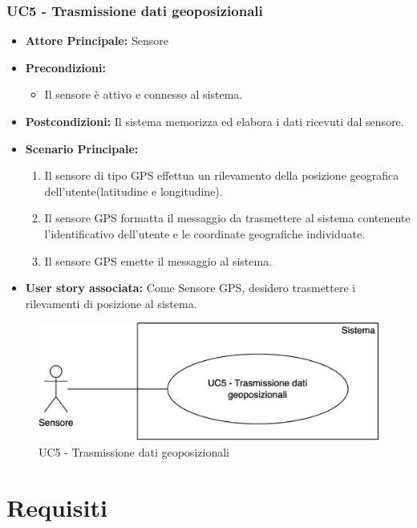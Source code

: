 \documentclass[11pt]{article}
\begin{document}
\begin{justify}
\subsubsection{\textbf{UC5 - Trasmissione dati geoposizionali}}
\begin{itemize}
    \item \textbf{Attore Principale:} Sensore
    \item \textbf{Precondizioni:} 
        \begin{itemize}
    	\item Il sensore è attivo e connesso al sistema.
        \end{itemize}
    \item \textbf{Postcondizioni:} Il sistema memorizza ed elabora i dati ricevuti dal sensore.
    \item \textbf{Scenario Principale:} 
        \begin{enumerate}
            \item Il sensore di tipo GPS effettua un rilevamento della posizione geografica dell'utente(latitudine e longitudine).
            \item Il sensore GPS formatta il messaggio da trasmettere al sistema contenente l’identificativo dell'utente e le coordinate geografiche individuate.
            \item Il sensore GPS emette il messaggio al sistema.
        \end{enumerate}
    \item \textbf{User story associata:} Come Sensore GPS, desidero trasmettere i rilevamenti di posizione al sistema.

\end{itemize}
\begin{figure}[ht]
    \centering
    \includegraphics[width=0.5\linewidth]{UC5image.png}
    \caption{UC5 - Trasmissione dati geoposizionali}
    \label{fig:UC5}
\end{figure}


\newpage
\section{Requisiti}


\end{justify}
\end{document}
